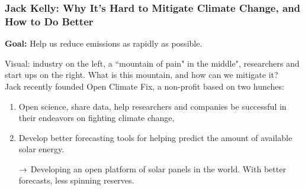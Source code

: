 \spacerule

\subsubsection{Jack Kelly: Why It's Hard to Mitigate Climate Change, and How to Do Better}

{\bf Goal:} Help us reduce emissions as rapidly as possible. \\


Visual: industry on the left, a ``mountain of pain" in the middle", researchers and start ups on the right. What is this mountain, and how can we mitigate it? \\

Jack recently founded Open Climate Fix, a non-profit based on two hunches:
\begin{enumerate}
    \item Open science, share data, help researchers and companies be successful in their endeavors on fighting climate change,
    \item Develop better forecasting tools for helping predict the amount of available solar energy.
    
    $\rightarrow$ Developing an open platform of solar panels in the world. With better forecasts, less spinning reserves.
\end{enumerate}

